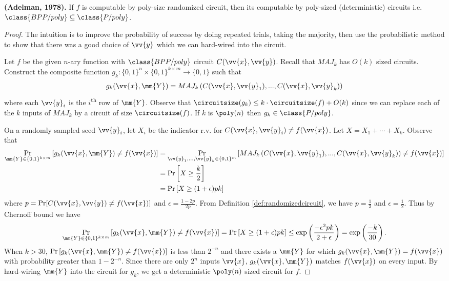 \begin{theorem}
	\textbf{(Adelman, 1978).} If $f$ is computable by poly-size randomized circuit, then its computable by poly-sized (deterministic) circuits i.e. $\class{BPP/poly} \subseteq \class{P/poly}$.
\end{theorem}
\begin{proof}
	The intuition is to improve the probability of success by doing repeated trials, taking the majority, then use the probabilistic method to show that there was a good choice of $\vv{y}$ which we can hard-wired into the circuit.
	
	Let $f$ be the given $n$-ary function with $\class{BPP/poly}$ circuit $C(\vv{x}, \vv{y})$. Recall that $MAJ_k$ has $O(k)$ sized circuits. Construct the composite function $g_k: \{0, 1\}^{n} \times \{0,1\}^{k \times m} \rightarrow \{0,1\}$ such that 
	\[g_k(\vv{x}, \mm{Y}) = MAJ_k\left(C(\vv{x}, \vv{y}_1), ..., C(\vv{x}, \vv{y}_k)\right)\] 
	where each $\vv{y}_i$ is the $i$\textsuperscript{th} row of $\mm{Y}$. Observe that $\circuitsize(g_k) \leq k \cdot \circuitsize(f) + O(k)$ since we can replace each of the $k$ inputs of $MAJ_k$ by a circuit of size $\circuitsize(f)$. If $k$ is $\poly(n)$ then $g_k \in \class{P/poly}$.
	
	On a randomly sampled seed $\vv{y}_i$, let $X_i$ be the indicator r.v. for $C(\vv{x}, \vv{y}_i) \neq f(\vv{x})$. Let $X = X_1 + \cdots + X_k$. Observe that 
	\begin{align*}
		\Pr_{\mm{Y} \in \{0,1\}^{k \times m}}\left[g_k(\vv{x}, \mm{Y}) \neq f(\vv{x})\right] &= \Pr_{\vv{y}_1, ..., \vv{y}_k \in \{0,1\}^{m}}\left[MAJ_k\left(C(\vv{x}, \vv{y}_1), ..., C(\vv{x}, \vv{y}_k)\right) \neq f(\vv{x})\right]\\
		&= \Pr\left[X \geq \frac{k}{2}\right]\\
		&= \Pr\left[X \geq (1 + \epsilon)pk\right]
	\end{align*}
	where $p = \Pr[C(\vv{x}, \vv{y}) \neq f(\vv{x})]$ and $\epsilon = \frac{1 - 2p}{2p}$. From Definition \ref{def:randomizedcircuit}, we have $p = \frac{1}{3}$ and $\epsilon = \frac{1}{2}$. Thus by Chernoff bound we have
	\[\Pr_{\mm{Y} \in \{0,1\}^{k \times m}}\left[g_k(\vv{x}, \mm{Y}) \neq f(\vv{x})\right] = \Pr\left[X \geq (1 + \epsilon)pk\right] \leq \exp\left(\frac{-\epsilon^2pk}{2 + \epsilon}\right) = \exp\left(\frac{-k}{30}\right).\]
	When $k > 30$, $\Pr\left[g_k(\vv{x}, \mm{Y}) \neq f(\vv{x})\right]$ is less than $2^{-n}$ and there exists a $\mm{Y}$ for which $g_k(\vv{x}, \mm{Y}) = f(\vv{x})$ with probability greater than $1 - 2^{-n}$. Since there are only $2^{n}$ inputs $\vv{x}$, $g_k(\vv{x}, \mm{Y})$ matches $f(\vv{x})$ on every input. By hard-wiring $\mm{Y}$ into the circuit for $g_k$, we get a deterministic $\poly(n)$ sized circuit for $f$. 
\end{proof}

